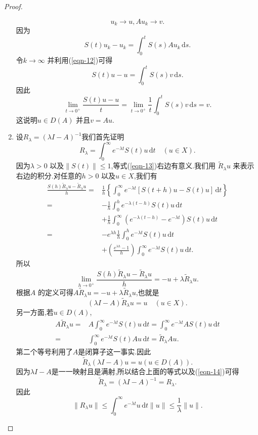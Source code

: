 \begin{proof}
\begin{enumerate}
\begin{equation}
         u_k\to u, A u_k\to v.
       \end{equation}
       因为
       \[
	 S(t)u_k -u_k=\int_0^{t}S(s)Au_k\,\mathrm{d}s.
       \] 
       令$k\to \infty$ 并利用(\ref{eqn-12})可得
       \[
	 S(t)u-u=\int_0^{t}S(s)v\,\mathrm{d}s.
       \] 
       因此
       \[
	 \lim_{t\to 0^{+}} \frac{S(t)u-u}{t}=\lim_{t\to 0^{+}}\frac{1}{t}\int_0^{t}S(s)v \,\mathrm{d}s=v.
       \] 
       这说明$u\in D(A)$ 并且$v=Au$. 
     \item 设$R_\lambda=\left( \lambda I-A \right) ^{-1}$我们首先证明
       \begin{equation}\label{eqn-13}
	 R_\lambda =\int_0^{\infty}e^{-\lambda t}S(t) u \, \mathrm{d}t \quad \left( u\in X \right) .
       \end{equation}
       因为$\lambda>0$ 以及$\|S(t)\|\le 1$,等式(\ref{eqn-13})右边有意义.我们用 $\widetilde{R}_\lambda u$ 来表示右边的积分.对任意的$h>0$ 以及$u \in X$,我们有
  \begin{align*}
    \frac{S(h)\widetilde{R}_\lambda u-\widetilde{R}_\lambda u}{h}=& \frac{1}{h}\left\{ \int_0^{\infty}e^{-\lambda t}[S(t+h)u-S(t)u]\,\mathrm{d}t\right\} \\
    =& -\frac{1}{h}\int_0^{h}e^{-\lambda(t-h)}S(t)u\,\mathrm{d}t\\
    &+ \frac{1}{h}\int_0^{\infty}(e^{-\lambda(t-h)}-e^{-\lambda t})S(t)u\,\mathrm{d}t\\
    = & -e^{\lambda h}\frac{1}{h}\int_0^{h}e^{-\lambda t }S(t)u\,\mathrm{d}t\\
    &+\left( \frac{e^{\lambda h}-1}{h} \right) \int_0^{\infty}e^{-\lambda t}S(t)u\,\mathrm{d}t
  .\end{align*}
  所以
  \[
    \lim_{h\to 0^{+}}\frac{S(h)\widetilde{R}_\lambda u-\widetilde{R}_\lambda u}{h}=-u +\lambda \widetilde{R}_\lambda u.
  \]
  根据$A$ 的定义可得$A \widetilde{R}_\lambda u=-u+\lambda \widetilde{R}_\lambda u$,也就是
  \begin{equation}
    \left( \lambda I-A \right) \widetilde{R}_\lambda u =u \quad (u\in X).\label{eqn-14}
  \end{equation}
  另一方面,若$u\in D(A)$,
  \begin{align*}
    A\widetilde{R}_\lambda u = & A\int_0^{\infty}e^{-\lambda t}S(t)u\,\mathrm{d}t=\int_0^{\infty}e^{-\lambda t}AS(t)u\,\mathrm{d}t\\
    = & \int_0^{\infty}e^{-\lambda t}S(t)Au\,\mathrm{d}t=\widetilde{R}_\lambda A u.
  \end{align*}
第二个等号利用了$A$是闭算子这一事实.因此
 \[
   \widetilde{R}_\lambda \left( \lambda I-A \right) u=u \left( u\in D(A) \right) .
 \] 因为$\lambda I-A$是一一映射且是满射,所以结合上面的等式以及(\ref{eqn-14})可得
  \begin{equation}
    \widetilde{R}_\lambda=(\lambda I-A)^{-1}=R_\lambda.
 \end{equation}
 因此
 \[
 \|R_\lambda u\|\le \int_0^{\infty}e^{-\lambda t}u\,\mathrm{d}t \|u\|\le \frac{1}{\lambda}\|u\|.
 \] 
  \end{enumerate}
\end{proof}
